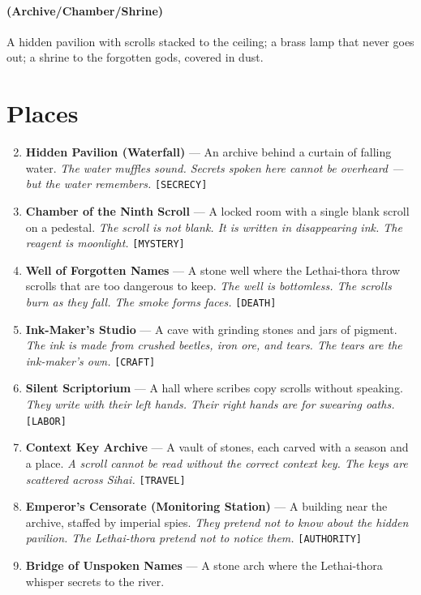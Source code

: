 \paragraph*{(Archive/Chamber/Shrine)} A hidden pavilion with scrolls stacked to the ceiling; a brass lamp that never goes out; a shrine to the forgotten gods, covered in dust.

\section*{ Places}
\label{sec:lethai-thora-places}
\begin{enumerate}
\setcounter{enumi}{1}
\item \textbf{Hidden Pavilion (Waterfall)} --- An archive behind a curtain of falling water.
  \hfill \textit{The water muffles sound. Secrets spoken here cannot be overheard --- but the water remembers.} \texttt{[SECRECY]}
\item \textbf{Chamber of the Ninth Scroll} --- A locked room with a single blank scroll on a pedestal.
  \hfill \textit{The scroll is not blank. It is written in disappearing ink. The reagent is moonlight.} \texttt{[MYSTERY]}
\item \textbf{Well of Forgotten Names} --- A stone well where the Lethai-thora throw scrolls that are too dangerous to keep.
  \hfill \textit{The well is bottomless. The scrolls burn as they fall. The smoke forms faces.} \texttt{[DEATH]}
\item \textbf{Ink-Maker's Studio} --- A cave with grinding stones and jars of pigment.
  \hfill \textit{The ink is made from crushed beetles, iron ore, and tears. The tears are the ink-maker's own.} \texttt{[CRAFT]}
\item \textbf{Silent Scriptorium} --- A hall where scribes copy scrolls without speaking.
  \hfill \textit{They write with their left hands. Their right hands are for swearing oaths.} \texttt{[LABOR]}
\item \textbf{Context Key Archive} --- A vault of stones, each carved with a season and a place.
  \hfill \textit{A scroll cannot be read without the correct context key. The keys are scattered across Sihai.} \texttt{[TRAVEL]}
\item \textbf{Emperor's Censorate (Monitoring Station)} --- A building near the archive, staffed by imperial spies.
  \hfill \textit{They pretend not to know about the hidden pavilion. The Lethai-thora pretend not to notice them.} \texttt{[AUTHORITY]}
\item \textbf{Bridge of Unspoken Names} --- A stone arch where the Lethai-thora whisper secrets to the river.

\end{enumerate}
